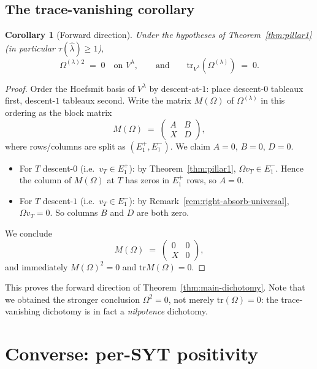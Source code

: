 \documentclass[11pt]{article}
\newtheorem{corollary}[theorem]{Corollary}
\theoremstyle{definition}
\newcommand{\Vlam}{V^{\lambda}}
\newcommand{\Om}{\Omega}
\newcommand{\bla}{\widehat\lambda}
\newcommand{\tr}{\mathrm{tr}}
\newcommand{\Eplus}{E^{+}}
\newcommand{\Eminus}{E^{-}}
\begin{document}
\subsection{The trace-vanishing corollary}

\begin{corollary}[Forward direction]\label{cor:forward}
Under the hypotheses of Theorem~\ref{thm:pillar1} (in particular $\tau(\bla) \ge 1$),
\[
   \Om^{(\lambda)\,2} \;=\; 0\quad\text{on } \Vlam,
   \qquad\text{and}\qquad
   \tr_{\Vlam}(\Om^{(\lambda)}) \;=\; 0.
\]
\end{corollary}

\begin{proof}
Order the Hoefsmit basis of $\Vlam$ by descent-at-$1$: place descent-$0$ tableaux first, descent-$1$ tableaux second.  Write the matrix $M(\Om)$ of $\Om^{(\lambda)}$ in this ordering as the block matrix
\[
   M(\Om) \;=\; \begin{pmatrix} A & B \\ X & D \end{pmatrix},
\]
where rows/columns are split as $(\Eplus_1, \Eminus_1)$.  We claim $A = 0$, $B = 0$, $D = 0$.
\begin{itemize}[topsep=2pt,itemsep=2pt]
\item For $T$ descent-$0$ (i.e.\ $v_T \in \Eplus_1$): by Theorem~\ref{thm:pillar1}, $\Om v_T \in \Eminus_1$.  Hence the column of $M(\Om)$ at $T$ has zeros in $\Eplus_1$ rows, so $A = 0$.
\item For $T$ descent-$1$ (i.e.\ $v_T \in \Eminus_1$): by Remark~\ref{rem:right-absorb-universal}, $\Om v_T = 0$.  So columns $B$ and $D$ are both zero.
\end{itemize}
We conclude
\[
   M(\Om) \;=\; \begin{pmatrix} 0 & 0 \\ X & 0 \end{pmatrix},
\]
and immediately $M(\Om)^2 = 0$ and $\tr M(\Om) = 0$.
\end{proof}

This proves the forward direction of Theorem~\ref{thm:main-dichotomy}.  Note that we obtained the stronger conclusion $\Om^2 = 0$, not merely $\tr(\Om) = 0$: the trace-vanishing dichotomy is in fact a \emph{nilpotence} dichotomy.


\section{Converse: per-SYT positivity}\label{sec:converse-positivity}
\end{document}
